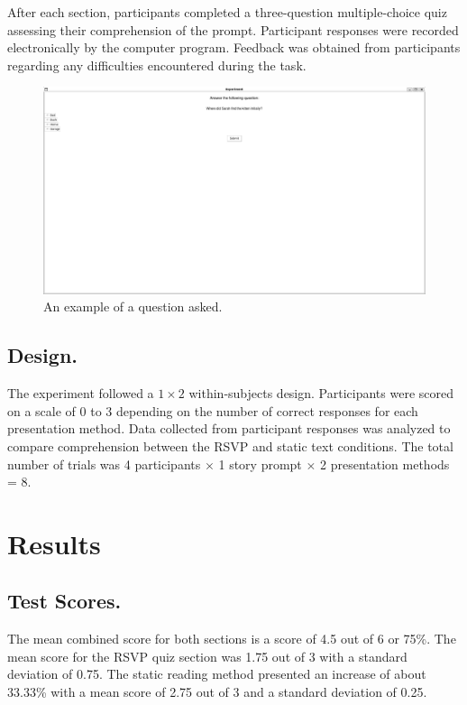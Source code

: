 \documentclass[manuscript,screen]{acmart}
\begin{document}
After each section, participants completed a three-question multiple-choice quiz assessing their comprehension of the prompt. Participant responses were recorded electronically by the computer program. Feedback was obtained from participants regarding any difficulties encountered during the task.

\begin{figure}[htbp]
  \centering
  \includegraphics[width=\linewidth]{question-example.PNG}
  \caption{An example of a question asked.}
\end{figure}

\FloatBarrier

\subsection{Design.} 
The experiment followed a $1 \times 2$ within-subjects design. Participants were scored on a scale of 0 to 3 depending on the number of correct responses for each presentation method. Data collected from participant responses was analyzed to compare comprehension between the RSVP and static text conditions. The total number of trials was 4 participants $\times$ 1 story prompt $\times$ 2 presentation methods = 8.

\section{Results}
\subsection{Test Scores.}
The mean combined score for both sections is a score of 4.5 out of 6 or 75\%. The mean score for the RSVP quiz section was 1.75 out of 3 with a standard deviation of 0.75. The static reading method presented an increase of about 33.33\% with a mean score of 2.75 out of 3 and a standard deviation of 0.25.
\end{document}
